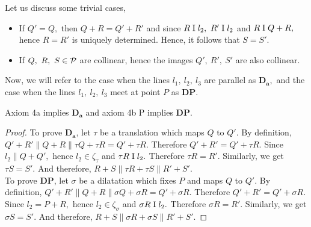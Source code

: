 \begin{center}
\end{center}

Let us discuss some trivial cases, 
\begin{itemize}
    \item If $Q'=Q,$ then $Q+R=Q'+R'$ and since $R \mathrel\text{I} l_2, \ R' \mathrel\text{I} l_2$ and $R \mathrel\text{I} Q+R,$  hence $R=R'$ is uniquely determined. Hence, it follows that $S=S'.$
    \item If $Q, \ R, \ S \in \mathcal{P}$ are collinear, hence the images $Q', \ R', \ S'$ are also collinear.
\end{itemize}

Now, we will refer to the case when the lines $l_1, \ l_2, \ l_3$ are parallel as $\mathbf{D_a},$ and the case when the lines $l_1, \ l_2, \ l_3$ meet at point $P$ as $\mathbf{DP}.$

\begin{theorem}
    Axiom 4a implies $\mathbf{D_a}$ and axiom 4b P implies $\mathbf{DP}.$
\end{theorem}

\begin{proof}
    To prove $\mathbf{D_a}$, let $\tau$ be a translation which maps $Q$ to $Q'.$ By definition, $Q'+R' \parallel Q+R \parallel \tau Q + \tau R = Q' + \tau R.$ Therefore $Q'+ R' = Q'+\tau R.$ Since $l_2 \parallel Q+Q',$ hence $l_2 \in \zeta_\tau$ and $\tau R \mathrel\text{I} l_2.$ Therefore $\tau R= R'.$ Similarly, we get $\tau S = S'.$ And therefore, $R+S \parallel \tau R + \tau S \parallel R'+S'. $ \\
    To prove $\mathbf{DP}$, let $\sigma$ be a dilatation which fixes $P$ and maps $Q$ to $Q'.$ By definition, $Q'+R' \parallel Q+R \parallel \sigma Q + \sigma R = Q' + \sigma R.$ Therefore $Q'+ R' = Q'+\sigma R.$ Since $l_2 = P+R,$ hence $l_2 \in \zeta_\sigma$ and $\sigma R \mathrel\text{I} l_2.$ Therefore $\sigma R= R'.$ Similarly, we get $\sigma S = S'.$ And therefore, $R+S \parallel \sigma R + \sigma S \parallel R'+S'. $    
\end{proof}

